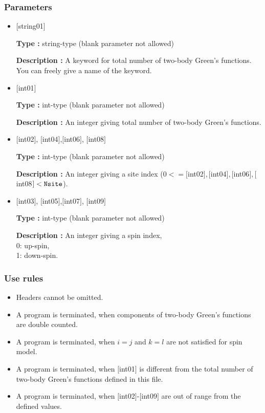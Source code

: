 \subsubsection{Parameters}
 \begin{itemize}
    \item  $[$string01$]$
   
    {\bf Type :} string-type (blank parameter not allowed)

   {\bf Description :} A keyword for total number of two-body Green's functions. You can freely give a name of the keyword.

   \item  $[$int01$]$
   
    {\bf Type :} int-type (blank parameter not allowed)

   {\bf Description :}  An integer giving total number of two-body Green's functions.


  \item  $[$int02$]$, $[$int04$]$,$[$int06$]$, $[$int08$]$

 {\bf Type :} int-type (blank parameter not allowed)

{\bf Description :} An integer giving a site index ($0<= [$int02$], [$int04$], [$int06$], [$int08$]<\verb|Nsite|$).
 
  \item  $[$int03$]$, $[$int05$]$,$[$int07$]$, $[$int09$]$

 {\bf Type :} int-type (blank parameter not allowed)

{\bf Description :} 
An integer giving a spin index,\\
0: up-spin,\\
1: down-spin.

\end{itemize}

\subsubsection{Use rules}
\begin{itemize}
\item Headers cannot be omitted. 
\item A program is terminated, when components of two-body Green's functions are double counted.
\item {A program is terminated, when $i=j$ and $k=l$ are not satisfied for spin model.}
\item A program is terminated, when $[$int01$]$ is different from the total number of two-body Green's functions defined in this file.
\item A program is terminated, when $[$int02$]$-$[$int09$]$ are out of range from the defined values.
\end{itemize}

